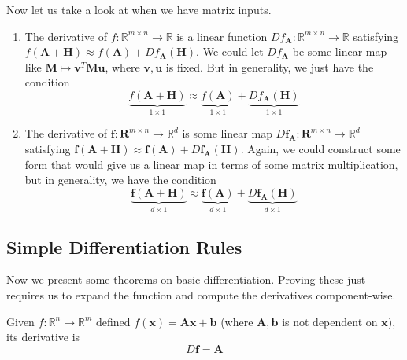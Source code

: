   Now let us take a look at when we have matrix inputs. 
  \begin{enumerate}
      \item The derivative of $f: \mathbb{R}^{m \times n} \longrightarrow \mathbb{R}$ is a linear function $D f_{\mathbf{A}} : \mathbb{R}^{m \times n} \longrightarrow \mathbb{R}$ satisfying $f(\mathbf{A} + \mathbf{H}) \approx f(\mathbf{A}) + D f_{\mathbf{A}} (\mathbf{H})$. We could let $D f_{\mathbf{A}}$ be some linear map like $\mathbf{M} \mapsto \mathbf{v}^T \mathbf{M} \mathbf{u}$, where $\mathbf{v}, \mathbf{u}$ is fixed. But in generality, we just have the condition 
      \[\underbrace{f(\mathbf{A} + \mathbf{H})}_{1 \times 1} \approx \underbrace{f(\mathbf{A})}_{1 \times 1} + \underbrace{D f_{\mathbf{A}} (\mathbf{H})}_{1 \times 1}\]
      
      \item The derivative of $\mathbf{f}: \mathbf{R}^{m \times n} \longrightarrow \mathbb{R}^d$ is some linear map $D \mathbf{f}_\mathbf{A} : \mathbf{R}^{m \times n} \longrightarrow \mathbb{R}^d$ satisfying $\mathbf{f} (\mathbf{A} + \mathbf{H}) \approx \mathbf{f}(\mathbf{A}) + D \mathbf{f}_\mathbf{A} (\mathbf{H})$. Again, we could construct some form that would give us a linear map in terms of some matrix multiplication, but in generality, we have the condition 
      \[\underbrace{\mathbf{f} (\mathbf{A} + \mathbf{H})}_{d \times 1} \approx \underbrace{\mathbf{f}(\mathbf{A})}_{d \times 1} + \underbrace{D \mathbf{f}_\mathbf{A} (\mathbf{H})}_{d \times 1}\]
  \end{enumerate}

  \subsection{Simple Differentiation Rules}

  Now we present some theorems on basic differentiation. Proving these just requires us to expand the function and compute the derivatives component-wise. 

  \begin{theorem}
  Given $f: \mathbb{R}^n \longrightarrow \mathbb{R}^m$ defined $f(\mathbf{x}) = \mathbf{A} \mathbf{x} + \mathbf{b}$ (where $\mathbf{A}, \mathbf{b}$ is not dependent on $\mathbf{x}$), its derivative is 
  \[D \mathbf{f} = \mathbf{A}\]
  \end{theorem}

